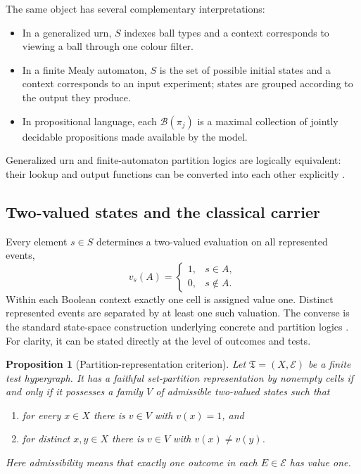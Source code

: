 \documentclass[
  aps,
  pra,
  twocolumn,
  amsmath,
  amssymb,
  longbibliography,
  nofootinbib,
  floatfix
]{revtex4-2}
\newtheorem{proposition}{Proposition}
\newcommand{\cB}{\mathcal B}
\newcommand{\cE}{\mathcal E}
\begin{document}
The same object has several complementary interpretations:
\begin{itemize}
\item In a generalized urn, $S$ indexes ball types and a context corresponds to
viewing a ball through one colour filter.
\item In a finite Mealy automaton, $S$ is the set of possible initial states and
a context corresponds to an input experiment; states are grouped according to
the output they produce.
\item In propositional language, each $\cB(\pi_j)$ is a maximal collection of
jointly decidable propositions made available by the model.
\end{itemize}
Generalized urn and finite-automaton partition logics are logically equivalent:
their lookup and output functions can be converted into each other explicitly
\cite{svozil-2001-eua}.

\subsection{Two-valued states and the classical carrier}

Every element $s\in S$ determines a two-valued evaluation on all represented
events,
\begin{equation}
  v_s(A)=
  \begin{cases}
  1,&s\in A,\\
  0,&s\notin A.
  \end{cases}
  \label{eq:valuation}
\end{equation}
Within each Boolean context exactly one cell is assigned value one.  Distinct
represented events are separated by at least one such valuation.  The converse
is the standard state-space construction underlying concrete and partition
logics \cite{ZirlSchl-65,kochen1,svozil-tkadlec,dvur-pul-svo,
svozil-2001-eua}.  For clarity, it can be stated directly at the level of
outcomes and tests.

\begin{proposition}[Partition-representation criterion]
Let $\mathfrak T=(X,\cE)$ be a finite test hypergraph.  It has a faithful
set-partition representation by nonempty cells if and only if it possesses a
family $V$ of admissible two-valued states such that
\begin{enumerate}
\item for every $x\in X$ there is $v\in V$ with $v(x)=1$, and
\item for distinct $x,y\in X$ there is $v\in V$ with $v(x)\ne v(y)$.
\end{enumerate}
Here admissibility means that exactly one outcome in each $E\in\cE$ has value
one.
\end{proposition}
\end{document}
